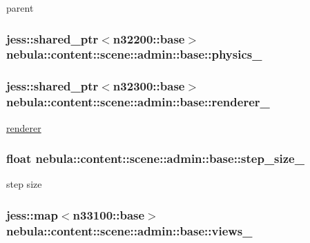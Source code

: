 parent \hypertarget{classnebula_1_1content_1_1scene_1_1admin_1_1base_a706a5d543d24f378081805b9c4fa30cf}{
\subsubsection[{physics\_\-}]{\setlength{\rightskip}{0pt plus 5cm}jess::shared\_\-ptr$<${\bf n32200::base}$>$ {\bf nebula::content::scene::admin::base::physics\_\-}}}
\label{classnebula_1_1content_1_1scene_1_1admin_1_1base_a706a5d543d24f378081805b9c4fa30cf}
\hypertarget{classnebula_1_1content_1_1scene_1_1admin_1_1base_ae3b90128d4dbb33841420641cac2f2e4}{
\subsubsection[{renderer\_\-}]{\setlength{\rightskip}{0pt plus 5cm}jess::shared\_\-ptr$<${\bf n32300::base}$>$ {\bf nebula::content::scene::admin::base::renderer\_\-}}}
\label{classnebula_1_1content_1_1scene_1_1admin_1_1base_ae3b90128d4dbb33841420641cac2f2e4}


\hyperlink{namespacenebula_1_1content_1_1scene_1_1renderer}{renderer} \hypertarget{classnebula_1_1content_1_1scene_1_1admin_1_1base_a6295f7c5b915ef50dfd1a50399cef6df}{
\subsubsection[{step\_\-size\_\-}]{\setlength{\rightskip}{0pt plus 5cm}float {\bf nebula::content::scene::admin::base::step\_\-size\_\-}}}
\label{classnebula_1_1content_1_1scene_1_1admin_1_1base_a6295f7c5b915ef50dfd1a50399cef6df}


step size \hypertarget{classnebula_1_1content_1_1scene_1_1admin_1_1base_a96b192f79813e94c2c44fd834b2a23de}{
\subsubsection[{views\_\-}]{\setlength{\rightskip}{0pt plus 5cm}jess::map$<${\bf n33100::base}$>$ {\bf nebula::content::scene::admin::base::views\_\-}}}
\label{classnebula_1_1content_1_1scene_1_1admin_1_1base_a96b192f79813e94c2c44fd834b2a23de}


